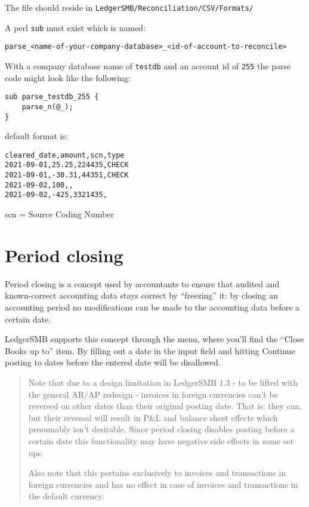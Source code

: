 The file should reside in \texttt{LedgerSMB/Reconciliation/CSV/Formats/}

A perl \texttt{sub} must exist which is named:

\begin{verbatim}
parse_<name-of-your-company-database>_<id-of-account-to-reconcile>
\end{verbatim}

With a company database name of \texttt{testdb} and an account id of \texttt{255} the parse code might look like the following:

\begin{verbatim}
sub parse_testdb_255 {
    parse_n(@_);
}
\end{verbatim}

default format is:
\begin{verbatim}
cleared_date,amount,scn,type
2021-09-01,25.25,224435,CHECK
2021-09-01,-30.31,44351,CHECK
2021-09-02,100,,
2021-09-02,-425,3321435,
\end{verbatim}

scn = Source Coding Number

\section{Period closing}
\label{sec-workflows-accounting-period-closing}

Period closing is a concept used by accountants to ensure that audited and
known-correct accounting data stays correct by ``freezing'' it: by closing
an accounting period no modifications can be made to the accounting data
before a certain date.

LedgerSMB supports this concept through the 
menu, where you'll find the ``Close Books up to'' item. By filling out a date
in the input field and hitting Continue posting to dates before the entered
date will be disallowed.


\begin{quotation}
Note that due to a design limitation in LedgerSMB 1.3 - to be lifted with the
general AR/AP redesign - invoices in foreign currencies can't be reversed on
other dates than their original posting date. That is: they can, but their
reversal will result in P\&L and balance sheet effects which presumably isn't
desirable. Since period closing disables posting before a certain date this
functionality may have negative side effects in some set ups.

Also note that this pertains exclusively to invoices and transactions in foreign
currencies and has no effect in case of invoices and transactions in the default
currency.
\end{quotation}

